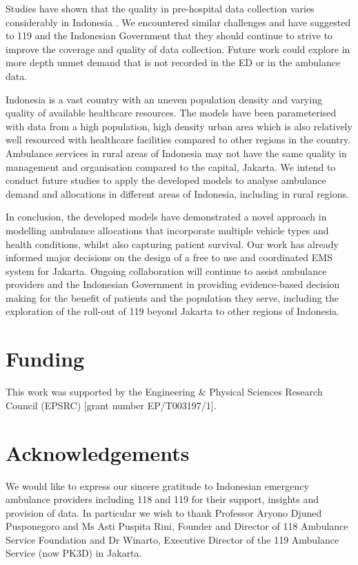 \documentclass[numbers,webpdf,imaman]{ima-authoring-template}%
\begin{document}
Studies have shown that the quality in pre-hospital data collection varies
considerably in Indonesia \citep{hooper2019_datacollection}. We encountered
similar challenges and have suggested to 119 and the Indonesian Government
that they should continue to strive to improve the coverage and quality of
data collection. Future work could explore in more depth unmet demand that is
not recorded in the ED or in the ambulance data.

Indonesia is a vast country with an uneven population density and varying
quality of available healthcare resources. The models have been parameterised
with data from a high population, high density urban area which is also
relatively well resourced with healthcare facilities compared to other regions
in the country. Ambulance services in rural areas of Indonesia may not have
the same quality in management and organisation compared to the capital,
Jakarta. We intend to conduct future studies to apply the developed models to
analyse ambulance demand and allocations in different areas of Indonesia,
including in rural regions.

In conclusion, the developed models have demonstrated a novel approach in
modelling ambulance allocations that incorporate multiple vehicle types and
health conditions, whilst also capturing patient survival. Our work has
already informed major decisions on the design of a free to use and
coordinated EMS system for Jakarta. Ongoing collaboration will continue to
assist ambulance providers and the Indonesian Government in providing
evidence-based decision making for the benefit of patients and the population
they serve, including the exploration of the roll-out of 119 beyond Jakarta to
other regions of Indonesia. 


\section*{Funding}
This work was supported by the Engineering \& Physical Sciences Research Council
(EPSRC) [grant number EP/T003197/1].

\section*{Acknowledgements}
We would like to express our sincere gratitude to Indonesian emergency ambulance
providers including 118 and 119 for their support, insights and provision of
data. In particular we wish to thank Professor Aryono Djuned Pusponegoro and Ms
Asti Puspita Rini, Founder and Director of 118 Ambulance Service Foundation and
Dr Winarto, Executive Director of the 119 Ambulance Service (now PK3D) in Jakarta.
\end{document}

